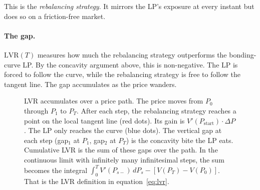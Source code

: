 \documentclass[11pt]{article}
\theoremstyle{definition}
\theoremstyle{remark}
\newcommand{\1}{\mathbf{1}}
\begin{document}
This is the \emph{rebalancing strategy}. It mirrors the LP's exposure at every instant but does so on a friction-free market.

\paragraph{The gap.}
$\mathrm{LVR}(T)$ measures how much the rebalancing strategy outperforms the bonding-curve LP. By the concavity argument above, this is non-negative. The LP is forced to follow the curve, while the rebalancing strategy is free to follow the tangent line. The gap accumulates as the price wanders.

\begin{figure}[h]
\centering
{}
\caption{LVR accumulates over a price path. The price moves from $P_0$ through $P_1$ to $P_T$. After each step, the rebalancing strategy reaches a point on the local tangent line (red dots). Its gain is $V'(P_{\text{start}}) \cdot \Delta P$. The LP only reaches the curve (blue dots). The vertical gap at each step (gap$_1$ at $P_1$, gap$_2$ at $P_T$) is the concavity bite the LP eats. Cumulative LVR is the sum of these gaps over the path. In the continuous limit with infinitely many infinitesimal steps, the sum becomes the integral $\int_0^T V'(P_{s-})\,dP_s - [V(P_T) - V(P_0)]$. That is the LVR definition in equation~\eqref{eq:lvr}.}
\label{fig:LVR-path}
\end{figure}
\end{document}
